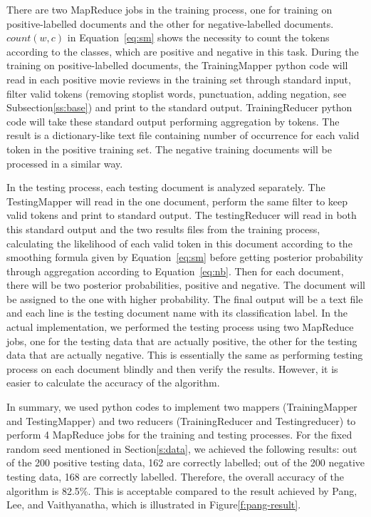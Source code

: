 There are two MapReduce jobs in the training process, one for training on 
positive-labelled documents and the other for negative-labelled documents. 
$count(w,c)$ in Equation~\ref{eq:sm} shows the necessity to count the 
tokens according to the classes, which are positive and negative in this task. 
During the training on positive-labelled documents, the TrainingMapper 
python code will read in each positive movie reviews in the training set 
through standard input, filter valid tokens (removing stoplist words, 
punctuation, adding negation, see Subsection\ref{ss:base}) and print to the 
standard output. TrainingReducer python code will take these standard 
output performing aggregation by tokens. The result is a dictionary-like text 
file containing number of occurrence for each valid token in the positive 
training set. The negative training documents will be processed in a similar 
way. 

 In the testing process, each testing document is analyzed separately. The 
 TestingMapper will read in the one document, perform the same filter to 
 keep valid tokens and print to standard output. The testingReducer will read 
 in both this standard output and the two results files from the training 
 process, calculating the likelihood of each valid token in this document 
 according to the smoothing formula given by Equation~\ref{eq:sm} before 
 getting posterior probability through aggregation according to 
 Equation~\ref{eq:nb}. Then for each document, there will be two posterior 
 probabilities, positive and negative. The document will be assigned to the 
 one with higher probability. The final output will be a text file and each line is 
 the testing document name with its classification label. In the actual 
 implementation, we performed the testing process using two MapReduce 
 jobs, one for the testing data that are actually positive, the other for the 
 testing data that are actually negative. This is essentially the same as 
 performing testing process on each document blindly and then verify the 
 results. However, it is easier to calculate the accuracy of the algorithm. 
 
 In summary, we used python codes to implement two mappers 
 (TrainingMapper and TestingMapper) and two reducers (TrainingReducer 
 and Testingreducer) to perform 4 MapReduce jobs for the training and 
 testing processes. For the fixed random seed mentioned in 
 Section\ref{s:data}, we achieved the following results: out of the 200 
 positive testing data, 162 are correctly labelled; out of the 200 negative 
 testing data, 168 are correctly labelled. Therefore, the
 overall accuracy of the algorithm is 82.5\%. This is acceptable 
 compared to the result achieved by Pang, Lee, and Vaithyanatha, which is 
 illustrated in Figure\ref{f:pang-result}. 
% 

